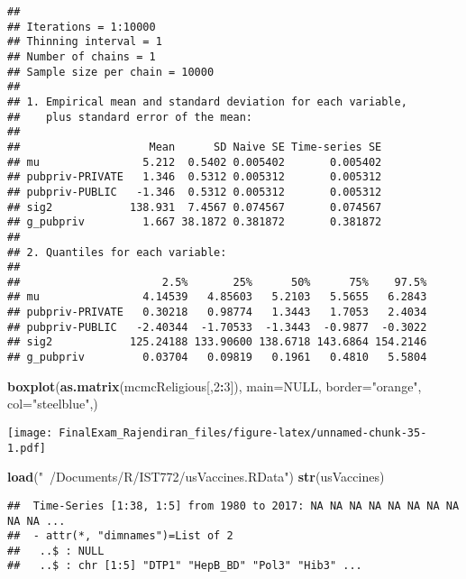 \documentclass[]{article}
\newenvironment{Shaded}{\begin{snugshade}}{\end{snugshade}}
\newcommand{\DataTypeTok}[1]{\textcolor[rgb]{0.13,0.29,0.53}{#1}}
\newcommand{\DecValTok}[1]{\textcolor[rgb]{0.00,0.00,0.81}{#1}}
\newcommand{\KeywordTok}[1]{\textcolor[rgb]{0.13,0.29,0.53}{\textbf{#1}}}
\newcommand{\NormalTok}[1]{#1}
\newcommand{\OperatorTok}[1]{\textcolor[rgb]{0.81,0.36,0.00}{\textbf{#1}}}
\newcommand{\OtherTok}[1]{\textcolor[rgb]{0.56,0.35,0.01}{#1}}
\newcommand{\StringTok}[1]{\textcolor[rgb]{0.31,0.60,0.02}{#1}}
\begin{document}
\begin{verbatim}
## 
## Iterations = 1:10000
## Thinning interval = 1 
## Number of chains = 1 
## Sample size per chain = 10000 
## 
## 1. Empirical mean and standard deviation for each variable,
##    plus standard error of the mean:
## 
##                    Mean      SD Naive SE Time-series SE
## mu                5.212  0.5402 0.005402       0.005402
## pubpriv-PRIVATE   1.346  0.5312 0.005312       0.005312
## pubpriv-PUBLIC   -1.346  0.5312 0.005312       0.005312
## sig2            138.931  7.4567 0.074567       0.074567
## g_pubpriv         1.667 38.1872 0.381872       0.381872
## 
## 2. Quantiles for each variable:
## 
##                      2.5%       25%      50%      75%    97.5%
## mu                4.14539   4.85603   5.2103   5.5655   6.2843
## pubpriv-PRIVATE   0.30218   0.98774   1.3443   1.7053   2.4034
## pubpriv-PUBLIC   -2.40344  -1.70533  -1.3443  -0.9877  -0.3022
## sig2            125.24188 133.90600 138.6718 143.6864 154.2146
## g_pubpriv         0.03704   0.09819   0.1961   0.4810   5.5804
\end{verbatim}

\begin{Shaded}
\begin{Highlighting}[]
\KeywordTok{boxplot}\NormalTok{(}\KeywordTok{as.matrix}\NormalTok{(mcmcReligious[,}\DecValTok{2}\OperatorTok{:}\DecValTok{3}\NormalTok{]), }\DataTypeTok{main=}\OtherTok{NULL}\NormalTok{, }\DataTypeTok{border=}\StringTok{"orange"}\NormalTok{, }\DataTypeTok{col=}\StringTok{"steelblue"}\NormalTok{,)}
\end{Highlighting}
\end{Shaded}

\texttt{[image: FinalExam\_Rajendiran\_files/figure-latex/unnamed-chunk-35-1.pdf]}

\begin{Shaded}
\begin{Highlighting}[]
\KeywordTok{load}\NormalTok{(}\StringTok{"~/Documents/R/IST772/usVaccines.RData"}\NormalTok{)}
\KeywordTok{str}\NormalTok{(usVaccines)}
\end{Highlighting}
\end{Shaded}

\begin{verbatim}
##  Time-Series [1:38, 1:5] from 1980 to 2017: NA NA NA NA NA NA NA NA NA NA ...
##  - attr(*, "dimnames")=List of 2
##   ..$ : NULL
##   ..$ : chr [1:5] "DTP1" "HepB_BD" "Pol3" "Hib3" ...
\end{verbatim}
\end{document}
